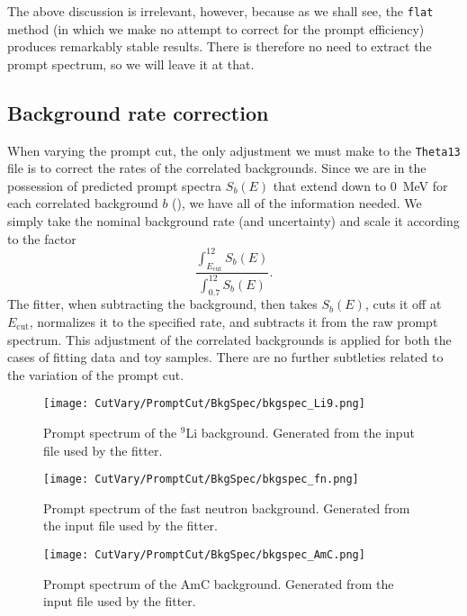 \documentclass[../thesis.tex]{subfiles}
\begin{document}
The above discussion is irrelevant, however, because as we shall see, the \texttt{flat} method (in which we make no attempt to correct for the prompt efficiency) produces remarkably stable results. There is therefore no need to extract the prompt spectrum, so we will leave it at that.

\subsection{Background rate correction}
\label{sec:cutVaryPromptCutBkg}

When varying the prompt cut, the only adjustment we must make to the \texttt{Theta13} file is to correct the rates of the correlated backgrounds. Since we are in the possession of predicted prompt spectra $S_b(E)$ that extend down to 0~MeV for each correlated background $b$ (), we have all of the information needed. We simply take the nominal background rate (and uncertainty) and scale it according to the factor
\[
  \frac{\int_{E_{\mathrm{cut}}}^{12} S_b(E)}{\int_{0.7}^{12} S_b(E)}.
\]
The fitter, when subtracting the background, then takes $S_b(E)$, cuts it off at $E_{\mathrm{cut}}$, normalizes it to the specified rate, and subtracts it from the raw prompt spectrum. This adjustment of the correlated backgrounds is applied for both the cases of fitting data and toy samples. There are no further subtleties related to the variation of the prompt cut.

\begin{figure}[h]
  \texttt{[image: CutVary/PromptCut/BkgSpec/bkgspec\_Li9.png]}
  \caption{Prompt spectrum of the $^9$Li background. Generated from the input file used by the fitter.}
  \label{fig:bkgspec_Li9}
\end{figure}

\begin{figure}[h]
  \texttt{[image: CutVary/PromptCut/BkgSpec/bkgspec\_fn.png]}
  \caption{Prompt spectrum of the fast neutron background. Generated from the input file used by the fitter.}
  \label{fig:bkgspec_fn}
\end{figure}

\begin{figure}[h]
  \texttt{[image: CutVary/PromptCut/BkgSpec/bkgspec\_AmC.png]}
  \caption{Prompt spectrum of the AmC background. Generated from the input file used by the fitter.}
  \label{fig:bkgspec_AmC}
\end{figure}
\end{document}
